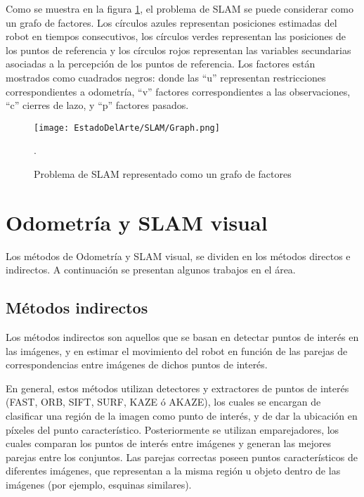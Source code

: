 Como se muestra en la figura \ref{fig:SLAMGraph}, el problema de SLAM se puede considerar como un grafo de factores. Los círculos azules representan posiciones estimadas del robot en tiempos consecutivos, los círculos verdes representan las posiciones de los puntos de referencia y los círculos rojos representan las variables secundarias asociadas a la percepción de los puntos de referencia. Los factores están mostrados como cuadrados negros: donde las “u” representan restricciones correspondientes a odometría, “v” factores correspondientes a las observaciones, “c” cierres de lazo, y “p” factores pasados.




\begin{figure}[H]
	\centering
	\texttt{[image: EstadoDelArte/SLAM/Graph.png]}
	\caption{Problema de SLAM representado como un grafo de factores \cite{Cadena}}.
    \label{fig:SLAMGraph}
\end{figure}



\section{Odometría  y SLAM visual}

Los métodos de Odometría y SLAM visual, se dividen en los métodos directos e indirectos. A continuación se presentan algunos trabajos en el área.

\subsection{Métodos indirectos}

Los métodos indirectos son aquellos que se basan en detectar puntos de interés en las imágenes, y en estimar el movimiento del robot en función de las parejas de correspondencias entre imágenes de dichos puntos de interés.

En general, estos métodos utilizan detectores y extractores de puntos de interés (FAST, ORB, SIFT, SURF, KAZE ó AKAZE), los cuales se encargan de clasificar una región de la imagen como punto de interés, y de dar la ubicación en píxeles del punto característico. Posteriormente se utilizan emparejadores, los cuales comparan los puntos de interés entre imágenes y generan las mejores parejas entre los conjuntos. Las parejas correctas poseen puntos característicos de diferentes imágenes, que representan a la misma región u objeto dentro de las imágenes (por ejemplo, esquinas similares). 

